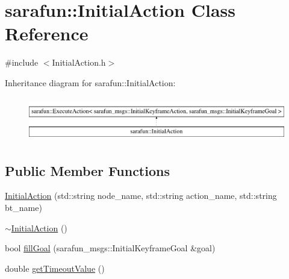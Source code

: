 \hypertarget{classsarafun_1_1InitialAction}{\section{sarafun\-:\-:Initial\-Action Class Reference}
\label{classsarafun_1_1InitialAction}
}


{\ttfamily \#include $<$Initial\-Action.\-h$>$}

Inheritance diagram for sarafun\-:\-:Initial\-Action\-:\begin{figure}[H]
\begin{center}
\leavevmode
\includegraphics[height=1.934370cm]{classsarafun_1_1InitialAction}
\end{center}
\end{figure}
\subsection*{Public Member Functions}
\begin{DoxyCompactItemize}
\item 
\hyperlink{classsarafun_1_1InitialAction_afecd855fe18671ea36bdab881603e8bc}{Initial\-Action} (std\-::string node\-\_\-name, std\-::string action\-\_\-name, std\-::string bt\-\_\-name)
\item 
\hyperlink{classsarafun_1_1InitialAction_af1f0a71513d093f5c2d7657b4b84661b}{$\sim$\-Initial\-Action} ()
\item 
bool \hyperlink{classsarafun_1_1InitialAction_aac7f439c30455349e075e91542565a43}{fill\-Goal} (sarafun\-\_\-msgs\-::\-Initial\-Keyframe\-Goal \&goal)
\item 
double \hyperlink{classsarafun_1_1InitialAction_a1b58c06c32ec9f9d3e75c37de5e7d2c8}{get\-Timeout\-Value} ()
\end{DoxyCompactItemize}



